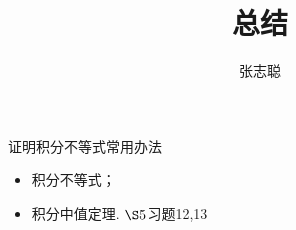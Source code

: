 \documentclass{article}
\begin{document}
\title{总结}
\author{张志聪}
\maketitle

\begin{zremark}
  证明积分不等式常用办法
\end{zremark}

\begin{itemize}
  \item 积分不等式；
  
  \item 积分中值定理.
        $\S 5$习题12,13
\end{itemize}
\end{document}
